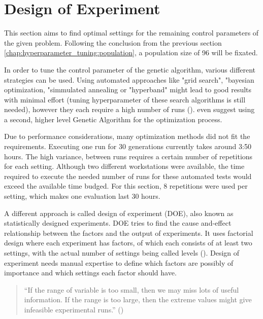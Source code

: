 \section{Design of Experiment}
\label{chap:hyperparameter_tuning:other_parameter}
This section aims to find optimal settings for the remaining control parameters of the given problem.
Following the conclusion from the previous section \ref{chap:hyperparameter_tuning:population}, a population size of 96 will be fixated. 

In order to tune the control parameter of the genetic algorithm, various different strategies can be used. Using automated approaches like "grid search", "bayesian optimization, "simmulated annealing or "hyperband" might lead to good results with minimal effort (tuning hyperparameter of these search algorithms is still needed), however they each require a high number of runs (\cite{kacprzyk_parameter_2007}). \cite{kacprzyk_parameter_2007} even suggest using a second, higher level Genetic Algorithm for the optimization process.

Due to performance considerations, many optimization methods did not fit the requirements.
Executing one run for 30 generations currently takes around 3:50 hours. The high variance, between runs requires a certain number of repetitions for each setting. Although two different workstations were available, the time required to execute the needed number of runs for these automated tests would exceed the available time budged. For this section, 8 repetitions were used per setting, which makes one evaluation last 30 hours.

A different approach is called design of experiment (DOE), also known as statistically designed experiments. DOE tries to find the cause and-effect relationship between the factors and the output of experiments.
It uses factorial design where each experiment has factors, of which each consists of at least two settings, with the actual number of settings being called levels (\cite{yang_design_2009}). Design of experiment needs manual expertise to define which factors are possibly of importance and which settings each factor should have.

\begin{quote}
	\begin{em}
		\enquote{If the range of variable is too small, then we may miss lots of useful information. If the range is too large, then the extreme values might give infeasible experimental runs.} (\cite{yang_design_2009})
	\end{em}
\end{quote}

